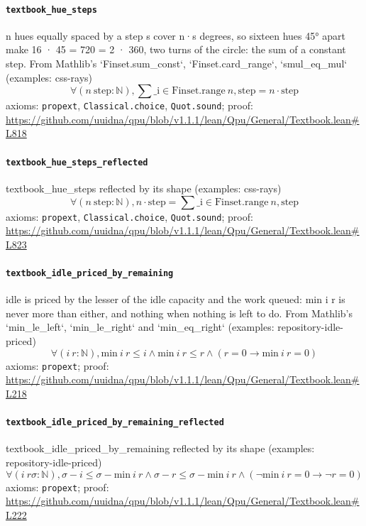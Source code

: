\documentclass[11pt]{article}
\begin{document}
\paragraph{\texttt{textbook\_hue\_steps}}
n hues equally spaced by a step s cover n·s degrees, so sixteen hues 45° apart make 16 · 45 = 720 = 2 · 360, two turns of the circle: the sum of a constant step. From Mathlib's `Finset.sum\_const`, `Finset.card\_range`, `smul\_eq\_mul` (examples: css-rays)
\[ \forall (n\ \mathrm{step} : \mathbb{N}), \sum \mathrm{\_i} \in \mathrm{Finset.range}\ n, \mathrm{step} = n \cdot \mathrm{step} \]
\noindent axioms: \texttt{propext}, \texttt{Classical.choice}, \texttt{Quot.sound}; proof: \url{https://github.com/uuidna/qpu/blob/v1.1.1/lean/Qpu/General/Textbook.lean\#L818}

\paragraph{\texttt{textbook\_hue\_steps\_reflected}}
textbook\_hue\_steps reflected by its shape (examples: css-rays)
\[ \forall (n\ \mathrm{step} : \mathbb{N}), n \cdot \mathrm{step} = \sum \mathrm{\_i} \in \mathrm{Finset.range}\ n, \mathrm{step} \]
\noindent axioms: \texttt{propext}, \texttt{Classical.choice}, \texttt{Quot.sound}; proof: \url{https://github.com/uuidna/qpu/blob/v1.1.1/lean/Qpu/General/Textbook.lean\#L823}

\paragraph{\texttt{textbook\_idle\_priced\_by\_remaining}}
idle is priced by the lesser of the idle capacity and the work queued: min i r is never more than either, and nothing when nothing is left to do. From Mathlib's `min\_le\_left`, `min\_le\_right` and `min\_eq\_right` (examples: repository-idle-priced)
\[ \forall (i\ r : \mathbb{N}), \mathrm{min}\ i\ r \le i \land \mathrm{min}\ i\ r \le r \land (r = 0 \to \mathrm{min}\ i\ r = 0) \]
\noindent axioms: \texttt{propext}; proof: \url{https://github.com/uuidna/qpu/blob/v1.1.1/lean/Qpu/General/Textbook.lean\#L218}

\paragraph{\texttt{textbook\_idle\_priced\_by\_remaining\_reflected}}
textbook\_idle\_priced\_by\_remaining reflected by its shape (examples: repository-idle-priced)
\[ \forall (i\ r \sigma : \mathbb{N}), \sigma - i \le \sigma - \mathrm{min}\ i\ r \land \sigma - r \le \sigma - \mathrm{min}\ i\ r \land (\neg \mathrm{min}\ i\ r = 0 \to \neg r = 0) \]
\noindent axioms: \texttt{propext}; proof: \url{https://github.com/uuidna/qpu/blob/v1.1.1/lean/Qpu/General/Textbook.lean\#L222}
\end{document}
